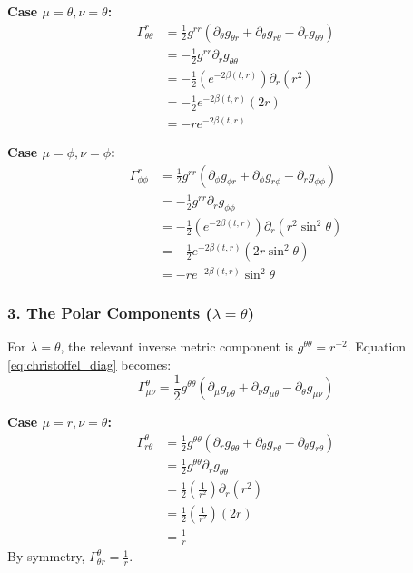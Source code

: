 \documentclass[11pt, a4paper]{report}
\begin{document}
\textbf{Case $\mu = \theta, \nu = \theta$:}
\begin{align}
    \Gamma^r_{\theta\theta} &= \frac{1}{2} g^{rr} (\partial_\theta g_{\theta r} + \partial_\theta g_{r\theta} - \partial_r g_{\theta\theta}) \nonumber \\
    &= -\frac{1}{2} g^{rr} \partial_r g_{\theta\theta} \nonumber \\
    &= -\frac{1}{2} \left( e^{-2\beta(t,r)} \right) \partial_r \left( r^2 \right) \nonumber \\
    &= -\frac{1}{2} e^{-2\beta(t,r)} (2r) \nonumber \\
    &= -r e^{-2\beta(t,r)}
\end{align}

\textbf{Case $\mu = \phi, \nu = \phi$:}
\begin{align}
    \Gamma^r_{\phi\phi} &= \frac{1}{2} g^{rr} (\partial_\phi g_{\phi r} + \partial_\phi g_{r\phi} - \partial_r g_{\phi\phi}) \nonumber \\
    &= -\frac{1}{2} g^{rr} \partial_r g_{\phi\phi} \nonumber \\
    &= -\frac{1}{2} \left( e^{-2\beta(t,r)} \right) \partial_r \left( r^2 \sin^2\theta \right) \nonumber \\
    &= -\frac{1}{2} e^{-2\beta(t,r)} \left( 2r \sin^2\theta \right) \nonumber \\
    &= -r e^{-2\beta(t,r)} \sin^2\theta
\end{align}

\subsubsection*{3. The Polar Components ($\lambda = \theta$)}

For $\lambda = \theta$, the relevant inverse metric component is $g^{\theta\theta} = r^{-2}$.
Equation \eqref{eq:christoffel_diag} becomes:
\begin{equation}
    \Gamma^\theta_{\mu\nu} = \frac{1}{2} g^{\theta\theta} (\partial_\mu g_{\nu\theta} + \partial_\nu g_{\mu\theta} - \partial_\theta g_{\mu\nu})
\end{equation}

\textbf{Case $\mu = r, \nu = \theta$:}
\begin{align}
    \Gamma^\theta_{r\theta} &= \frac{1}{2} g^{\theta\theta} (\partial_r g_{\theta\theta} + \partial_\theta g_{r\theta} - \partial_\theta g_{r\theta}) \nonumber \\
    &= \frac{1}{2} g^{\theta\theta} \partial_r g_{\theta\theta} \nonumber \\
    &= \frac{1}{2} \left( \frac{1}{r^2} \right) \partial_r \left( r^2 \right) \nonumber \\
    &= \frac{1}{2} \left( \frac{1}{r^2} \right) (2r) \nonumber \\
    &= \frac{1}{r}
\end{align}
By symmetry, $\Gamma^\theta_{\theta r} = \frac{1}{r}$.
\end{document}
